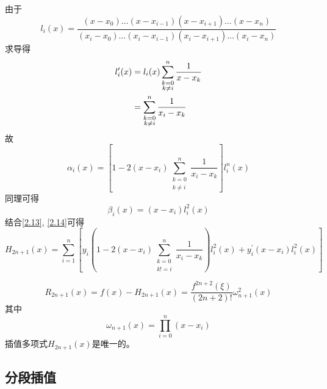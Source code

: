 \documentclass[12pt]{article}
\numberwithin{equation}{section}
\begin{document}
	由于
	$$
	l_i(x) = \frac{(x - x_0)\ldots (x - x_{i-1})(x - x_{i+1})\ldots (x - x_n)}{(x_i - x_0)\ldots (x_i - x_{i-1})(x_i - x_{i+1})\ldots (x_i - x_n)}
	$$
	求导得
	\begin{equation}
		\notag
		\begin{aligned}
			l_{i}^\prime (x) &= l_i(x) \sum_{\substack{k=0  \\ k \neq i}}^n \frac{1}{x - x_k}  \\
			&= \sum_{\substack{k=0  \\ k \neq i}}^n \frac{1}{x_i - x_k}
		\end{aligned}
	\end{equation}
	故
	\begin{equation} \tag{2.13} \label{2.13}
		\alpha_i(x) = \left[1 - 2\left(x - x_i \right)\sum_{\substack{k=0 \\ k \neq i}}^n \frac{1}{x_i - x_k}\right]l_{i}^n (x)
	\end{equation}
	同理可得
	\begin{equation} \tag{2.14} \label{2.14}
		\beta_i (x) = \left(x - x_i\right) l_{i}^2 (x) 
	\end{equation}
	结合\eqref{2.13}, \eqref{2.14}可得
	\begin{equation} \tag{2.15} \label{2.15}
		H_{2n+1}(x) = \sum_{i=1}^n\left[y_i \left(1 - 2\left(x - x_i\right) \sum_{\substack{k=0 \\ k!=i}}^n\frac{1}{x_i - x_k}\right)l_{i}^2 (x) + y_{i}^\prime (x - x_i)l_{i}^2 (x)\right]
	\end{equation}

	\begin{equation} \tag{2.16} \label{2.16}
		R_{2n+1}(x) = f(x) - H_{2n+1}(x) = \frac{f^{2n+2}(\xi)}{(2n+2)!}\omega_{n+1}^2(x)
	\end{equation}
	其中
	$$
	\omega_{n+1}(x) = \prod_{i=0}^n (x - x_i) 
	$$
	插值多项式$H_{2n+1}(x)$是唯一的。

	\subsection{分段插值}
\end{document}
